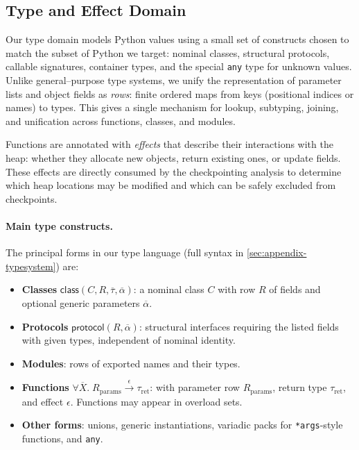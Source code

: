 \subsection{Type and Effect Domain}

Our type domain models Python values using a small set of constructs chosen to match the subset of Python we target: nominal classes, structural protocols, callable signatures, container types, and the special \texttt{any} type for unknown values.
Unlike general--purpose type systems, we unify the representation of parameter lists and object fields as \emph{rows}: finite ordered maps from keys (positional indices or names) to types.  
This gives a single mechanism for lookup, subtyping, joining, and unification across functions, classes, and modules.

Functions are annotated with \emph{effects} that describe their interactions with the heap: whether they allocate new objects, return existing ones, or update fields.  
These effects are directly consumed by the checkpointing analysis to determine which heap locations may be modified and which can be safely excluded from checkpoints.

\paragraph{Main type constructs.}
The principal forms in our type language (full syntax in \autoref{sec:appendix-typesystem}) are:
\begin{itemize}
  \item \textbf{Classes} $\mathsf{class}(C, R, \overline{\tau}, \overline{\alpha})$:
        a nominal class $C$ with row $R$ of fields and optional generic parameters $\overline{\alpha}$.
  \item \textbf{Protocols} $\mathsf{protocol}(R, \overline{\alpha})$:
        structural interfaces requiring the listed fields with given types, independent of nominal identity.
  \item \textbf{Modules}:
        rows of exported names and their types.
  \item \textbf{Functions} $\forall \overline{X}.\;R_{\mathrm{params}} \xrightarrow{\epsilon} \tau_{\mathrm{ret}}$:
        with parameter row $R_{\mathrm{params}}$, return type $\tau_{\mathrm{ret}}$, and effect $\epsilon$.
        Functions may appear in overload sets.
  \item \textbf{Other forms}:
        unions, generic instantiations, variadic packs for \texttt{*args}-style functions, and \texttt{any}.
\end{itemize}

